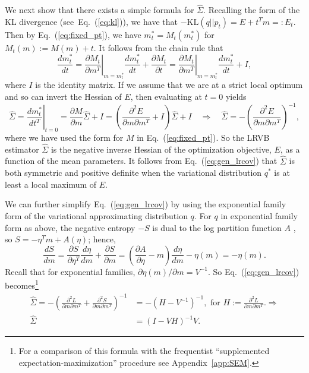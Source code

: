 \documentclass{article}\usepackage[]{graphicx}\usepackage[]{color}
\newcommand{\app}[1]{Appendix~\ref{app:#1}}
\newcommand{\eq}[1]{Eq.~(\ref{eq:#1})}
\newcommand{\npq}{\eta} %
\newcommand{\mpq}{m} %
\newcommand{\mpopt}{m^*} %
\newcommand{\lrcov}{\hat{\Sigma}} %
\newcommand{\klshort}{E}
\theoremstyle{plain}
\newcommand{\kl}{\textrm{KL}}
\begin{document}
We next show that there exists a simple formula for $\lrcov$.
Recalling the form of the KL divergence (see~\eq{kl}), we have that
$-\kl(q || p_t) = E + t^{T} m =: E_t$. Then by \eq{fixed_pt}, we have
$\mpopt_t = M_t(\mpopt_t)$ for $M_t(\mpq) := M(\mpq) + t$. It follows from
the chain rule that
\begin{equation}\label{eq:dM_dt}
  \frac{d\mpq^*_t}{dt}
    = \left. \frac{\partial M_t}{\partial \mpq^T} \right|_{\mpq = \mpopt_t}
      \frac{d\mpopt_t}{dt} + \frac{\partial M_t}{\partial t}
    = \left. \frac{\partial M_t}{\partial \mpq^T} \right|_{\mpq = \mpopt_t}
      \frac{d\mpopt_t}{dt} + I,
\end{equation}
where $I$ is the identity matrix.  If we assume that we are at a strict local
optimum and so can invert the Hessian of $E$, then evaluating at $t=0$ yields
%
\begin{equation}
  \label{eq:gen_lrcov}
  \lrcov = \left. \frac{d\mpq^*_t}{dt^T} \right|_{t=0} = \frac{\partial M}{\partial \mpq} \lrcov + I
    = \left(\frac{\partial^2 \klshort}{\partial \mpq \partial \mpq^T} + I \right) \lrcov + I
    \quad
    \Rightarrow
    \quad
    \lrcov = -\left(\frac{\partial^2 \klshort}{\partial \mpq \partial \mpq^T} \right)^{-1},
\end{equation}
%
where we have used the form for $M$ in \eq{fixed_pt}. So the LRVB estimator
$\lrcov$ is the negative inverse Hessian of the optimization objective, $E$, as
a function of the mean parameters. It follows from \eq{gen_lrcov} that $\lrcov$
is both symmetric and positive definite when the variational distribution
$q^{*}$ is at least a local maximum of $E$.

We can further simplify \eq{gen_lrcov} by using the exponential family form of
the variational approximating distribution $q$. For $q$ in exponential family
form as above, the negative entropy $-S$ is dual to the log partition function
$A$ \citep{wainwright2008graphical}, so $S = -\npq^T \mpq + A(\npq)$; hence,
%
$$
  \frac{dS}{dm}
    = \frac{\partial S}{\partial \npq^T} \frac{d\npq}{d\mpq} + \frac{\partial S}{\partial \mpq}
    = \left(\frac{\partial A}{\partial \npq} - \mpq \right) \frac{d\npq}{d\mpq} - \npq(\mpq)
    = - \npq(\mpq).
$$
%
Recall that for exponential families, $\partial \npq(\mpq) / \partial \mpq =
V^{-1}$. So \eq{gen_lrcov} becomes\footnote{For a comparison of this formula
with the frequentist ``supplemented expectation-maximization'' procedure see
\app{SEM}.}
%
\begin{align}
  \nonumber
  \lrcov = -\left(\frac{\partial^2 L}{\partial m \partial m^T} + \frac{\partial^2 S}{\partial m \partial m^T}\right)^{-1}
    &= -(H - V^{-1})^{-1}, \textrm{ for } H := \frac{\partial^2 L}{\partial m \partial m^T}.  \Rightarrow\\
  \label{eq:spec_lrvb}
  \lrcov &= (I - VH)^{-1} V.
\end{align}
\end{document}
